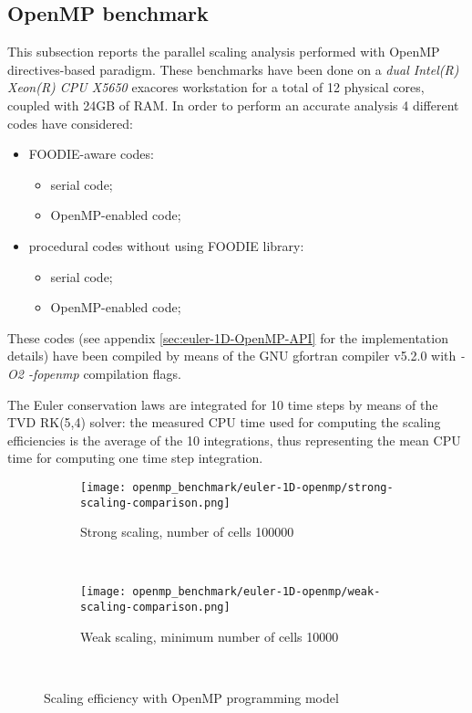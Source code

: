 \subsection{OpenMP benchmark}\label{subsec:openmp}

This subsection reports the parallel scaling analysis performed with OpenMP directives-based paradigm. These benchmarks have been done on a \emph{dual Intel(R) Xeon(R) CPU X5650} exacores workstation for a total of 12 physical cores, coupled with 24GB of RAM. In order to perform an accurate analysis 4 different codes have considered:

\begin{itemize}
  \item FOODIE-aware codes:
    \begin{itemize}
      \item serial code;
      \item OpenMP-enabled code;
      \end{itemize}
  \item procedural codes without using FOODIE library:
    \begin{itemize}
      \item serial code;
      \item OpenMP-enabled code;
      \end{itemize}
  \end{itemize}

These codes (see appendix \ref{sec:euler-1D-OpenMP-API} for the implementation details) have been compiled by means of the GNU gfortran compiler v5.2.0 with \emph{-O2 -fopenmp} compilation flags.

The Euler conservation laws are integrated for 10 time steps by means of the TVD RK(5,4) solver: the measured CPU time used for computing the scaling efficiencies is the average of the 10 integrations, thus representing the mean CPU time for computing one time step integration.

\begin{figure}[!ht]
  \centering
  \begin{subfigure}[b]{0.85\textwidth}
    \centering
    \texttt{[image: openmp\_benchmark/euler-1D-openmp/strong-scaling-comparison.png]}
    \caption{Strong scaling, number of cells 100000}\label{fig:strong-scaling-openmp}
  \end{subfigure}\\
  \begin{subfigure}[b]{0.85\textwidth}
    \centering
    \texttt{[image: openmp\_benchmark/euler-1D-openmp/weak-scaling-comparison.png]}
    \caption{Weak scaling, minimum number of cells 10000}\label{fig:weak-scaling-openmp}
  \end{subfigure}\\
  \caption{Scaling efficiency with OpenMP programming model}\label{fig:scaling-openmp}
\end{figure}

